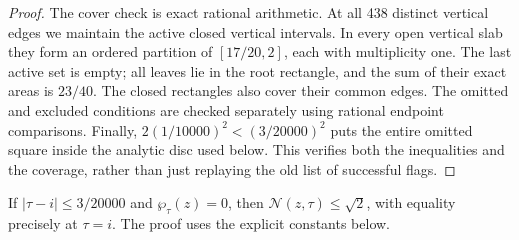 \begin{proof}
The cover check is exact rational arithmetic. At all 438 distinct
vertical edges we maintain the active closed vertical intervals. In
every open vertical slab they form an ordered partition of
$[17/20,2]$, each with multiplicity one. The last active set is empty;
all leaves lie in the root rectangle, and the sum of their exact areas
is $23/40$. The closed rectangles also cover their common edges.
The omitted and excluded conditions are checked separately using
rational endpoint comparisons. Finally,
$2(1/10000)^2<(3/20000)^2$ puts the entire omitted square inside the
analytic disc used below. This verifies both the inequalities and
the coverage, rather than just replaying the old list of successful
flags.
\end{proof}

\begin{theorem}\label{push:src:E.4.2}
If $|\tau-i|\leq3/20000$ and $\wp_\tau(z)=0$, then
$\mathcal N(z,\tau)\leq\sqrt2$, with equality precisely at
$\tau=i$. The proof uses the explicit constants below.
\end{theorem}

